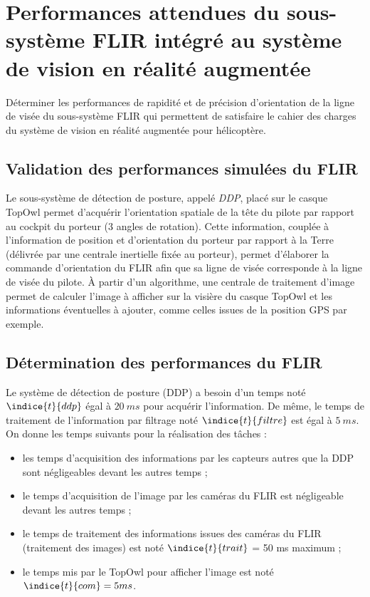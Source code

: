 \section{Performances attendues du sous-système FLIR intégré au système de vision en réalité augmentée}\label{partie1}

\begin{obj}
Déterminer les performances de rapidité et de précision d'orientation de la ligne de visée du sous-système
FLIR qui permettent de satisfaire le cahier des charges du système de vision en réalité augmentée
pour hélicoptère.
\end{obj}

\subsection{Validation des performances simulées du FLIR}

Le sous-système de détection de posture, appelé \textit{DDP}, placé sur le casque TopOwl permet d'acquérir l'orientation
spatiale de la tête du pilote par rapport au cockpit du porteur (3 angles de rotation). Cette information, couplée
à l'information de position et d'orientation du porteur par rapport à la Terre (délivrée par une centrale inertielle fixée au porteur), permet d'élaborer la commande d'orientation du FLIR afin que sa ligne de visée corresponde
à la ligne de visée du pilote. À partir d'un algorithme, une centrale de traitement d'image permet de calculer
l'image à afficher sur la visière du casque TopOwl et les informations éventuelles à ajouter, comme celles issues
de la position GPS par exemple.

\subsection{Détermination des performances du FLIR}

Le système de détection de posture (DDP) a besoin d'un temps noté $\indice{t}{ddp}$ égal à $\SI{20}{ms}$ pour acquérir l'information. De même, le temps de traitement de l'information par filtrage noté $\indice{t}{filtre}$ est égal à $\SI{5}{ms}$.
On donne les temps suivants pour la réalisation des tâches :
\begin{itemize}
\item les temps d'acquisition des informations par les capteurs autres que la DDP sont négligeables devant les
autres temps ;
\item le temps d'acquisition de l'image par les caméras du FLIR est négligeable devant les autres temps ;
\item le temps de traitement des informations issues des caméras du FLIR (traitement des images) est noté
$\indice{t}{trait}$ = 50 ms maximum ;
\item le temps mis par le TopOwl pour afficher l'image est noté $\indice{t}{com} = 5 ms$.
\end{itemize}

